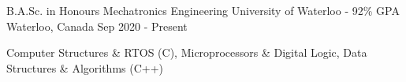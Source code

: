 

\begin{cventries}

  \cventry
    {B.A.Sc. in Honours Mechatronics Engineering} %
    {University of Waterloo - 92\% GPA} %
    {Waterloo, Canada} %
    {Sep 2020 - Present} %
    {
      \begin{cvitems}
        \item{Computer Structures \& RTOS (C), Microprocessors \& Digital Logic, Data Structures \& Algorithms (C++)}
      \end{cvitems}
    }
\end{cventries}

